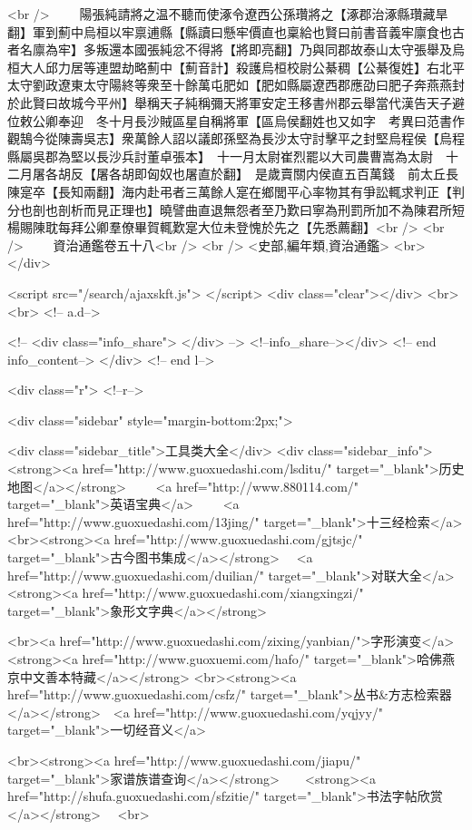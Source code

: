 <br />
　　陽張純請將之温不聽而使涿令遼西公孫瓚將之【涿郡治涿縣瓚藏旱翻】軍到薊中烏桓以牢禀逋縣【縣讀曰懸牢價直也稟給也賢曰前書音義牢廪食也古者名廪為牢】多叛還本國張純忿不得將【將即亮翻】乃與同郡故泰山太守張舉及烏桓大人邱力居等連盟劫略薊中【薊音計】殺護烏桓校尉公綦稠【公綦復姓】右北平太守劉政遼東太守陽終等衆至十餘萬屯肥如【肥如縣屬遼西郡應劭曰肥子奔燕燕封於此賢曰故城今平州】舉稱天子純稱彌天將軍安定王移書州郡云舉當代漢告天子避位敕公卿奉迎　冬十月長沙賊區星自稱將軍【區烏侯翻姓也又如字　考異曰范書作觀鵠今從陳壽吳志】衆萬餘人詔以議郎孫堅為長沙太守討擊平之封堅烏程侯【烏程縣屬吳郡為堅以長沙兵討董卓張本】　十一月太尉崔烈罷以大司農曹嵩為太尉　十二月屠各胡反【屠各胡即匈奴也屠直於翻】　是歲賣關内侯直五百萬錢　前太丘長陳寔卒【長知兩翻】海内赴弔者三萬餘人寔在鄉閭平心率物其有爭訟輒求判正【判分也剖也剖析而見正理也】曉譬曲直退無怨者至乃歎曰寧為刑罰所加不為陳君所短楊賜陳耽每拜公卿羣僚畢賀輒歎寔大位未登愧於先之【先悉薦翻】<br />
<br />
　　資治通鑑卷五十八<br />
<br />
<史部,編年類,資治通鑑>  <br>
   </div> 

<script src="/search/ajaxskft.js"> </script>
 <div class="clear"></div>
<br>
<br>
 <!-- a.d-->

 <!--
<div class="info_share">
</div> 
-->
 <!--info_share--></div>   <!-- end info_content-->
  </div> <!-- end l-->

<div class="r">   <!--r-->



<div class="sidebar"  style="margin-bottom:2px;">

 
<div class="sidebar_title">工具类大全</div>
<div class="sidebar_info">
<strong><a href="http://www.guoxuedashi.com/lsditu/" target="_blank">历史地图</a></strong>　　
<a href="http://www.880114.com/" target="_blank">英语宝典</a>　　
<a href="http://www.guoxuedashi.com/13jing/" target="_blank">十三经检索</a>　
<br><strong><a href="http://www.guoxuedashi.com/gjtsjc/" target="_blank">古今图书集成</a></strong>　
<a href="http://www.guoxuedashi.com/duilian/" target="_blank">对联大全</a>　<strong><a href="http://www.guoxuedashi.com/xiangxingzi/" target="_blank">象形文字典</a></strong>　

<br><a href="http://www.guoxuedashi.com/zixing/yanbian/">字形演变</a>　　<strong><a href="http://www.guoxuemi.com/hafo/" target="_blank">哈佛燕京中文善本特藏</a></strong>
<br><strong><a href="http://www.guoxuedashi.com/csfz/" target="_blank">丛书&方志检索器</a></strong>　<a href="http://www.guoxuedashi.com/yqjyy/" target="_blank">一切经音义</a>　　

<br><strong><a href="http://www.guoxuedashi.com/jiapu/" target="_blank">家谱族谱查询</a></strong>　　<strong><a href="http://shufa.guoxuedashi.com/sfzitie/" target="_blank">书法字帖欣赏</a></strong>　
<br>

